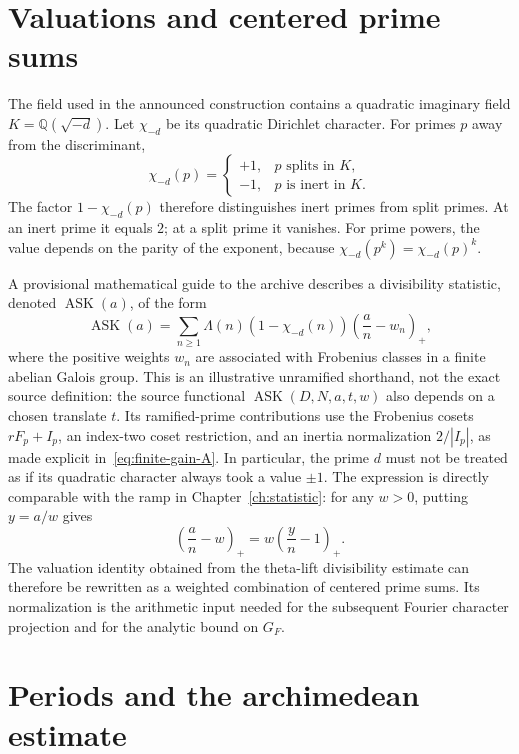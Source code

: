 \documentclass[11pt,openany,oneside]{scrbook}
\theoremstyle{definition}
\theoremstyle{remark}
\newcommand{\QQ}{\mathbb Q}
\begin{document}
\section{Valuations and centered prime sums}

The field used in the announced construction contains a quadratic imaginary field $K=\QQ(\sqrt{-d})$. Let $\chi_{-d}$ be its quadratic Dirichlet character. For primes $p$ away from the discriminant,
\[
\chi_{-d}(p)=\begin{cases}
+1,&p\text{ splits in }K,\\
-1,&p\text{ is inert in }K.
\end{cases}
\]
The factor $1-\chi_{-d}(p)$ therefore distinguishes inert primes from split primes. At an inert prime it equals $2$; at a split prime it vanishes. For prime powers, the value depends on the parity of the exponent, because $\chi_{-d}(p^k)=\chi_{-d}(p)^k$.

A provisional mathematical guide to the archive describes a divisibility statistic, denoted $\operatorname{ASK}(a)$, of the form
\begin{equation}\label{eq:ask}
\operatorname{ASK}(a)
=\sum_{n\ge1}\Lambda(n)(1-\chi_{-d}(n))
\left(\frac an-w_n\right)_+,
\end{equation}
where the positive weights $w_n$ are associated with Frobenius classes in a finite abelian Galois group. This is an illustrative unramified shorthand, not the exact source definition: the source functional $\operatorname{ASK}(D,N,a,t,w)$ also depends on a chosen translate $t$. Its ramified-prime contributions use the Frobenius cosets $rF_p+I_p$, an index-two coset restriction, and an inertia normalization $2/|I_p|$, as made explicit in~\eqref{eq:finite-gain-A}. In particular, the prime $d$ must not be treated as if its quadratic character always took a value $\pm1$. The expression is directly comparable with the ramp in Chapter~\ref{ch:statistic}: for any $w>0$, putting $y=a/w$ gives
\begin{equation}\label{eq:ramp-rescale}
\left(\frac an-w\right)_+
=w\left(\frac yn-1\right)_+.
\end{equation}
The valuation identity obtained from the theta-lift divisibility estimate can therefore be rewritten as a weighted combination of centered prime sums. Its normalization is the arithmetic input needed for the subsequent Fourier character projection and for the analytic bound on $G_F$.



\section{Periods and the archimedean estimate}
\end{document}
